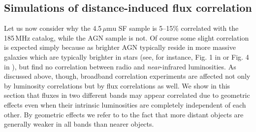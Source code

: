 \documentclass{emulateapj}
\begin{document}
\subsection{Simulations of distance-induced flux correlation}

Let us now consider why the 4.5\,$\mu$mu SF sample is 5--15\% correlated with the 185\,MHz catalog, while the AGN sample is not. Of course some slight correlation is expected simply because as brighter AGN typically reside in more massive galaxies which are typically brighter in stars (see, for instance, Fig. 1 in \citep{seymour07} or Fig. 4 in \citep{Willott03}), but \citet{mauch07} find no correlation between radio and \textit{near}-infrared luminosities. As discussed above, though, broadband correlation experiments are affected not only by luminosity correlations but by flux correlations as well. We show in this section that fluxes in two different bands may appear correlated due to geometric effects even when their intrinsic luminosities are completely independent of each other. By geometric effects we refer to to the fact that more distant objects are generally weaker in all bands than nearer objects. 
\end{document}
